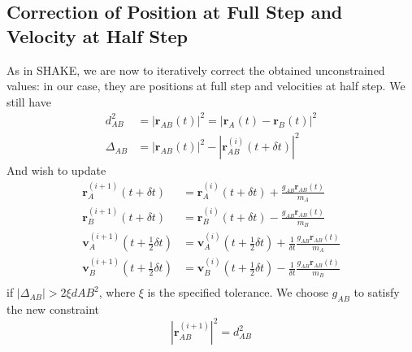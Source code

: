 \subsection{Correction of Position at Full Step and Velocity at Half Step}
\label{sec:rattle-correct-1}
\par As in SHAKE, we are now to iteratively correct the obtained unconstrained values: in our case, they are positions at full step and velocities at half step. We still have
\begin{equation*}
\begin{aligned}
d^2_{AB} 	  &= \left|\mathbf{r}_{AB}(t)\right|^2 = \left|\mathbf{r}_A(t) - \mathbf{r}_B (t)\right|^2	\\
\Delta_{AB} &= |\mathbf{r}_{AB}(t)|^2 - |\mathbf{r}^{(i)}_{AB}(t + \delta t)|^2
\end{aligned}
\end{equation*}
And wish to update 
\begin{equation}
\label{eq:rattle-update-1}
\begin{aligned}
	\mathbf{r}_A^{(i + 1)}(t + \delta t) &= \mathbf{r}_A^{(i)}(t + \delta t) + \frac{ g_{AB} \mathbf{r}_{AB} (t) }{m_A} \\
	\mathbf{r}_B^{(i + 1)}(t + \delta t) &= \mathbf{r}_B^{(i)}(t + \delta t) - \frac{ g_{AB} \mathbf{r}_{AB} (t) }{m_B} \\
	\mathbf{v}_A^{(i + 1)}(t + \frac{1}{2 }\delta t) &= \mathbf{v}_A^{(i)}(t + \frac{1}{2}\delta t) + \frac{1}{\delta t}  \frac{ g_{AB} \mathbf{r}_{AB} (t) }{m_A} \\
	\mathbf{v}_B^{(i + 1)}(t + \frac{1}{2 }\delta t) &= \mathbf{v}_B^{(i)}(t + \frac{1}{2}\delta t) - \frac{1}{\delta t}  \frac{ g_{AB} \mathbf{r}_{AB} (t) }{m_B} \\
\end{aligned}
\end{equation}
if $\left| \Delta_{AB} \right| > 2 \xi d{AB}^2$, where $\xi$ is the specified tolerance. We choose $g_{AB}$ to satisfy the new constraint
\begin{equation*}
	\left| \mathbf{r}^{(i+1)}_{AB} \right|^2 = d^2_{AB}
\end{equation*}
